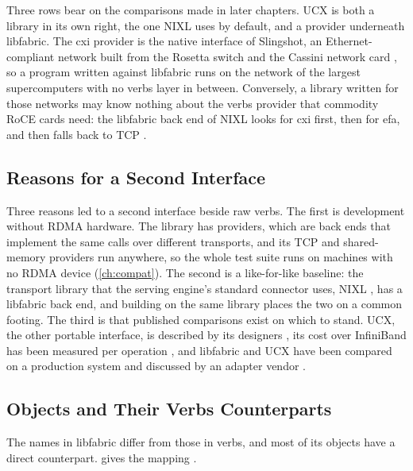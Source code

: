 Three rows bear on the comparisons made in later chapters. UCX is both a
library in its own right, the one NIXL uses by default, and a provider
underneath libfabric. The cxi provider is the native interface of Slingshot, an Ethernet-compliant
network built from the Rosetta switch and the Cassini network card
\citep{libfabric_repo}, so a program written against libfabric runs on the
network of the largest supercomputers with no verbs layer in between.
Conversely, a library written for those networks may know nothing about the
verbs provider that commodity RoCE cards need: the libfabric back end of NIXL
looks for cxi first, then for efa, and then falls back to TCP \citep{nixl}.

\subsection{Reasons for a Second Interface}

Three reasons led to a second interface beside raw verbs. The first is
development without RDMA hardware. The library has providers, which are back
ends that implement the same calls over different transports, and its TCP and
shared-memory providers run anywhere, so the whole test suite runs on
machines with no RDMA device (\cref{ch:compat}). The second is a
like-for-like baseline: the transport library that the serving engine's
standard connector uses, NIXL \citep{nixl}, has a libfabric back end, and
building on the same library places the two on a common footing. The third is
that published comparisons exist on which to stand. UCX, the other portable
interface, is described by its designers \citep{shamis2015ucx}, its cost over
InfiniBand has been measured per operation \citep{papadopoulou2017ucx}, and
libfabric and UCX have been compared on a production system
\citep{bareford2022} and discussed by an adapter vendor
\citep{smith2023opx}.

\subsection{Objects and Their Verbs Counterparts}

The names in libfabric differ from those in verbs, and most of its objects
have a direct counterpart.  gives the mapping
\citep{libfabric_man}.

